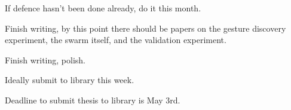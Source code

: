 If defence hasn't been done already, do it this month. 


Finish writing, by this point there should be papers on the gesture discovery experiment, the swarm itself, and the validation experiment. 


Finish writing, polish. 


Ideally submit to library this week.


Deadline to submit thesis to library is May 3rd.
